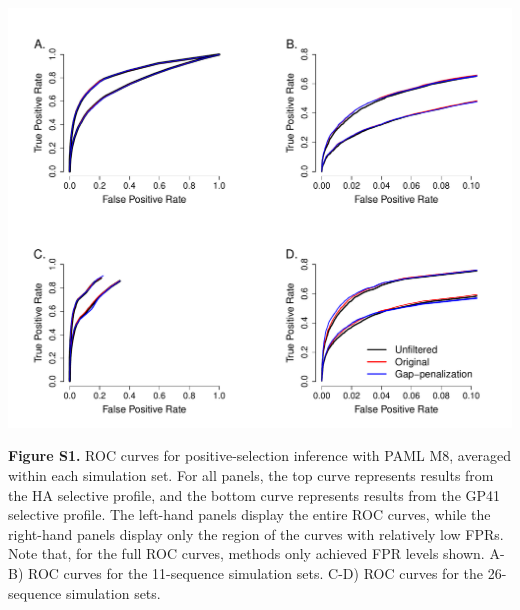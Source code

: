 \documentclass[11pt]{article}
\begin{document}
\centerline{\includegraphics[width=6.5in]{Figures/ROC_SI_paml.pdf}}
\noindent \textbf{Figure S1.} ROC curves for positive-selection inference with PAML M8, averaged within each simulation set. For all panels, the top curve represents results from the HA selective profile, and the bottom curve represents results from the GP41 selective profile. The left-hand panels display the entire ROC curves, while the right-hand panels display only the region of the curves with relatively low FPRs. Note that, for the full ROC curves, methods only achieved FPR levels shown. A-B) ROC curves for the 11-sequence simulation sets. C-D) ROC curves for the 26-sequence simulation sets.
\end{document}
